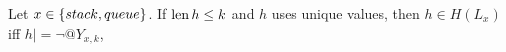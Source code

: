 \begin{theorem}
  Let $x \in {\{ stack, queue \}}$.
  If $\operatorname{len} h \le k$ and $h$ uses unique values,
  then $h \in H(L_x)$ if{f} $h |= \lnot @Y_{x,k}$,
\end{theorem}


